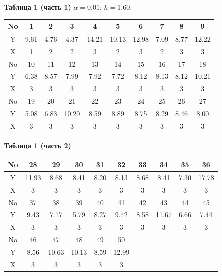 \documentclass[areasetadvanced]{scrartcl}
\begin{document}
\begin{enumerate}
    \textbf{Таблица 1 (часть 1)} \hspace{1em} $\alpha = 0.01$; $h = 1.60$.
    {\small
    \begin{longtable}{|c|*{9}{c|}}
    \hline
    No & 1 & 2 & 3 & 4 & 5 & 6 & 7 & 8 & 9 \\
    \hline
    Y & 9.61 & 4.76 & 4.37 & 14.21 & 10.13 & 12.98 & 7.09 & 8.77 & 12.22 \\
    \hline
    X & 1 & 2 & 2 & 3 & 2 & 3 & 2 & 3 & 3 \\
    \hline
    No & 10 & 11 & 12 & 13 & 14 & 15 & 16 & 17 & 18 \\
    \hline
    Y & 6.38 & 8.57 & 7.99 & 7.92 & 7.72 & 8.12 & 8.13 & 8.12 & 10.21 \\
    \hline
    X & 3 & 3 & 3 & 3 & 3 & 3 & 3 & 3 & 3 \\
    \hline
    No & 19 & 20 & 21 & 22 & 23 & 24 & 25 & 26 & 27 \\
    \hline
    Y & 5.08 & 6.83 & 10.20 & 8.59 & 8.89 & 8.75 & 8.29 & 8.46 & 8.00 \\
    \hline
    X & 3 & 3 & 3 & 3 & 3 & 3 & 3 & 3 & 3 \\
    \hline
    \end{longtable}
    }
    
    \textbf{Таблица 1 (часть 2)}
    {\small
    \begin{longtable}{|c|*{9}{c|}}
    \hline
    No & 28 & 29 & 30 & 31 & 32 & 33 & 34 & 35 & 36 \\
    \hline
    Y & 11.93 & 8.68 & 8.41 & 8.20 & 8.13 & 8.68 & 8.41 & 7.30 & 17.78 \\
    \hline
    X & 3 & 3 & 3 & 3 & 3 & 3 & 3 & 3 & 3 \\
    \hline
    No & 37 & 38 & 39 & 40 & 41 & 42 & 43 & 44 & 45 \\
    \hline
    Y & 9.43 & 7.17 & 5.79 & 8.27 & 9.42 & 8.58 & 11.67 & 6.66 & 7.44 \\
    \hline
    X & 3 & 3 & 3 & 3 & 3 & 3 & 3 & 3 & 3 \\
    \hline
    No & 46 & 47 & 48 & 49 & 50 \\
    \hline
    Y & 8.56 & 10.63 & 10.13 & 8.59 & 12.99 \\
    \hline
    X & 3 & 3 & 3 & 3 & 3 \\
    \hline
    \end{longtable}
    }
    

\end{enumerate}
\end{document}
